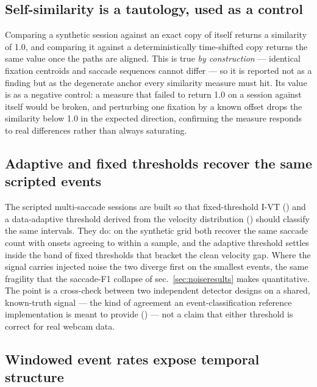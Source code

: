 \documentclass[
]{article}
\begin{document}
\subsection{Self-similarity is a tautology, used as a
control}\label{self-similarity-is-a-tautology-used-as-a-control}

Comparing a synthetic session against an exact copy of itself returns a
similarity of 1.0, and comparing it against a deterministically
time-shifted copy returns the same value once the paths are aligned.
This is true \emph{by construction} --- identical fixation centroids and
saccade sequences cannot differ --- so it is reported not as a finding
but as the degenerate anchor every similarity measure must hit. Its
value is as a negative control: a measure that failed to return 1.0 on a
session against itself would be broken, and perturbing one fixation by a
known offset drops the similarity below 1.0 in the expected direction,
confirming the measure responds to real differences rather than always
saturating.

\subsection{Adaptive and fixed thresholds recover the same scripted
events}\label{adaptive-and-fixed-thresholds-recover-the-same-scripted-events}

The scripted multi-saccade sessions are built so that fixed-threshold
I-VT () and a data-adaptive threshold derived from the velocity
distribution () should classify the same intervals. They do: on the synthetic
grid both recover the same saccade count with onsets agreeing to within
a sample, and the adaptive threshold settles inside the band of fixed
thresholds that bracket the clean velocity gap. Where the signal carries
injected noise the two diverge first on the smallest events, the same
fragility that the saccade-F1 collapse of sec.~\ref{sec:noiseresults}
makes quantitative. The point is a cross-check between two independent
detector designs on a shared, known-truth signal --- the kind of
agreement an event-classification reference implementation is meant to
provide ()
--- not a claim that either threshold is correct for real webcam data.

\subsection{Windowed event rates expose temporal
structure}\label{windowed-event-rates-expose-temporal-structure}
\end{document}
